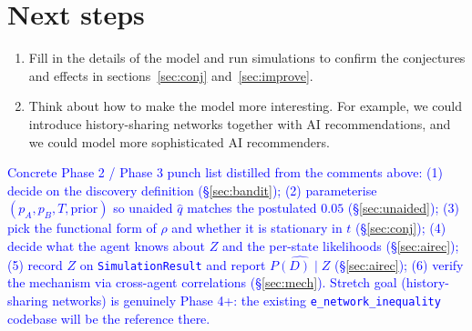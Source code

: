 \documentclass[12pt]{article}
\newcommand{\ignacio}[1]{\textcolor{blue}{#1}}
\begin{document}
\section{Next steps}
\label{sec:next}

\begin{enumerate}[leftmargin=*]
  \item Fill in the details of the model and run simulations to confirm the conjectures and effects in sections~\ref{sec:conj} and~\ref{sec:improve}.
  \item Think about how to make the model more interesting.
    For example, we could introduce history-sharing networks together with AI recommendations, and we could model more sophisticated AI recommenders.
\end{enumerate}

\ignacio{Concrete Phase 2 / Phase 3 punch list distilled from the comments above: (1) decide on the discovery definition (\S\ref{sec:bandit}); (2) parameterise $(p_A, p_B, T, \text{prior})$ so unaided $\hat q$ matches the postulated $0.05$ (\S\ref{sec:unaided}); (3) pick the functional form of $\rho$ and whether it is stationary in $t$ (\S\ref{sec:conj}); (4) decide what the agent knows about $Z$ and the per-state likelihoods (\S\ref{sec:airec}); (5) record $Z$ on \texttt{SimulationResult} and report $\widehat{P(D) \mid Z}$ (\S\ref{sec:airec}); (6) verify the mechanism via cross-agent correlations (\S\ref{sec:mech}). Stretch goal (history-sharing networks) is genuinely Phase 4+: the existing \texttt{e\_network\_inequality} codebase will be the reference there.}
\end{document}
